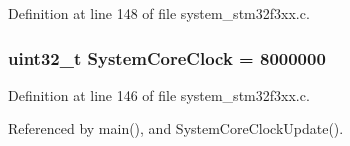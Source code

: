 Definition at line 148 of file system\+\_\+stm32f3xx.\+c.

\hypertarget{group___s_t_m32_f3xx___system___private___variables_gaa3cd3e43291e81e795d642b79b6088e6}{}
\subsubsection[{System\+Core\+Clock}]{\setlength{\rightskip}{0pt plus 5cm}uint32\+\_\+t System\+Core\+Clock = 8000000}\label{group___s_t_m32_f3xx___system___private___variables_gaa3cd3e43291e81e795d642b79b6088e6}


Definition at line 146 of file system\+\_\+stm32f3xx.\+c.



Referenced by main(), and System\+Core\+Clock\+Update().

